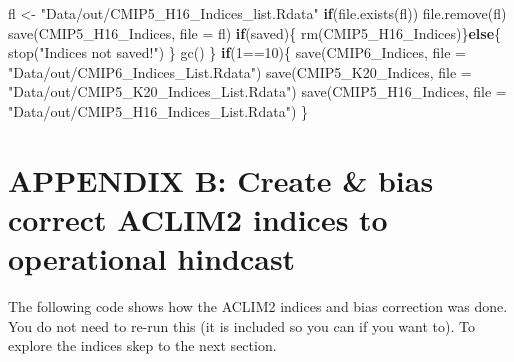 \documentclass[
]{article}
\newenvironment{Shaded}{\begin{snugshade}}{\end{snugshade}}
\newcommand{\AttributeTok}[1]{\textcolor[rgb]{0.77,0.63,0.00}{#1}}
\newcommand{\ControlFlowTok}[1]{\textcolor[rgb]{0.13,0.29,0.53}{\textbf{#1}}}
\newcommand{\DecValTok}[1]{\textcolor[rgb]{0.00,0.00,0.81}{#1}}
\newcommand{\FunctionTok}[1]{\textcolor[rgb]{0.00,0.00,0.00}{#1}}
\newcommand{\NormalTok}[1]{#1}
\newcommand{\OtherTok}[1]{\textcolor[rgb]{0.56,0.35,0.01}{#1}}
\newcommand{\SpecialCharTok}[1]{\textcolor[rgb]{0.00,0.00,0.00}{#1}}
\newcommand{\StringTok}[1]{\textcolor[rgb]{0.31,0.60,0.02}{#1}}
\begin{document}
\begin{Shaded}
\begin{Highlighting}[]
\NormalTok{      fl }\OtherTok{\textless{}{-}} \StringTok{"Data/out/CMIP5\_H16\_Indices\_list.Rdata"}
      \ControlFlowTok{if}\NormalTok{(}\FunctionTok{file.exists}\NormalTok{(fl)) }\FunctionTok{file.remove}\NormalTok{(fl)}
      \FunctionTok{save}\NormalTok{(CMIP5\_H16\_Indices, }\AttributeTok{file =}\NormalTok{ fl)}
      \ControlFlowTok{if}\NormalTok{(saved)\{}
        \FunctionTok{rm}\NormalTok{(CMIP5\_H16\_Indices)\}}\ControlFlowTok{else}\NormalTok{\{}
          \FunctionTok{stop}\NormalTok{(}\StringTok{"Indices not saved!"}\NormalTok{)}
\NormalTok{        \}}
      \FunctionTok{gc}\NormalTok{()}
\NormalTok{    \}}
    \ControlFlowTok{if}\NormalTok{(}\DecValTok{1}\SpecialCharTok{==}\DecValTok{10}\NormalTok{)\{}
      \FunctionTok{save}\NormalTok{(CMIP6\_Indices, }\AttributeTok{file =} \StringTok{"Data/out/CMIP6\_Indices\_List.Rdata"}\NormalTok{)}
      \FunctionTok{save}\NormalTok{(CMIP5\_K20\_Indices, }\AttributeTok{file =} \StringTok{"Data/out/CMIP5\_K20\_Indices\_List.Rdata"}\NormalTok{)}
      \FunctionTok{save}\NormalTok{(CMIP5\_H16\_Indices, }\AttributeTok{file =} \StringTok{"Data/out/CMIP5\_H16\_Indices\_List.Rdata"}\NormalTok{)}
\NormalTok{    \}}
\end{Highlighting}
\end{Shaded}

\hypertarget{appendix-b-create-bias-correct-aclim2-indices-to-operational-hindcast}{%
\section{APPENDIX B: Create \& bias correct ACLIM2 indices to
operational
hindcast}\label{appendix-b-create-bias-correct-aclim2-indices-to-operational-hindcast}}

The following code shows how the ACLIM2 indices and bias correction was
done. You do not need to re-run this (it is included so you can if you
want to). To explore the indices skep to the next section.
\end{document}

